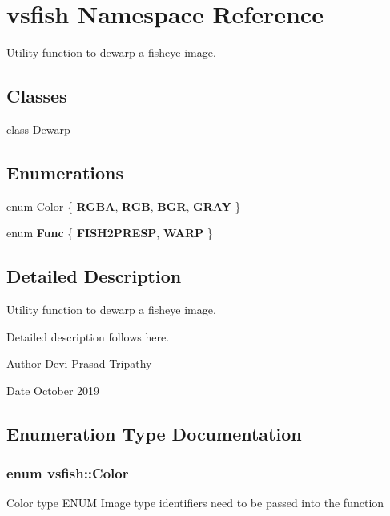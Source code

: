 \hypertarget{namespacevsfish}{}\section{vsfish Namespace Reference}
\label{namespacevsfish}


Utility function to dewarp a fisheye image.  


\subsection*{Classes}
\begin{DoxyCompactItemize}
\item 
class \hyperlink{classvsfish_1_1Dewarp}{Dewarp}
\end{DoxyCompactItemize}
\subsection*{Enumerations}
\begin{DoxyCompactItemize}
\item 
enum \hyperlink{namespacevsfish_a2db8e5547732b077dd979a4ec9031a3e}{Color} \{ {\bfseries R\+G\+BA}, 
{\bfseries R\+GB}, 
{\bfseries B\+GR}, 
{\bfseries G\+R\+AY}
 \}
\item 
enum {\bfseries Func} \{ {\bfseries F\+I\+S\+H2\+P\+R\+E\+SP}, 
{\bfseries W\+A\+RP}
 \}\hypertarget{namespacevsfish_a9a41cc04707b802a26a34a38ee9d86fb}{}\label{namespacevsfish_a9a41cc04707b802a26a34a38ee9d86fb}

\end{DoxyCompactItemize}


\subsection{Detailed Description}
Utility function to dewarp a fisheye image. 

Detailed description follows here. \begin{DoxyAuthor}{Author}
Devi Prasad Tripathy 
\end{DoxyAuthor}
\begin{DoxyDate}{Date}
October 2019 
\end{DoxyDate}


\subsection{Enumeration Type Documentation}
\subsubsection[{\texorpdfstring{Color}{Color}}]{\setlength{\rightskip}{0pt plus 5cm}enum {\bf vsfish\+::\+Color}}\hypertarget{namespacevsfish_a2db8e5547732b077dd979a4ec9031a3e}{}\label{namespacevsfish_a2db8e5547732b077dd979a4ec9031a3e}
Color type E\+N\+UM Image type identifiers need to be passed into the function 